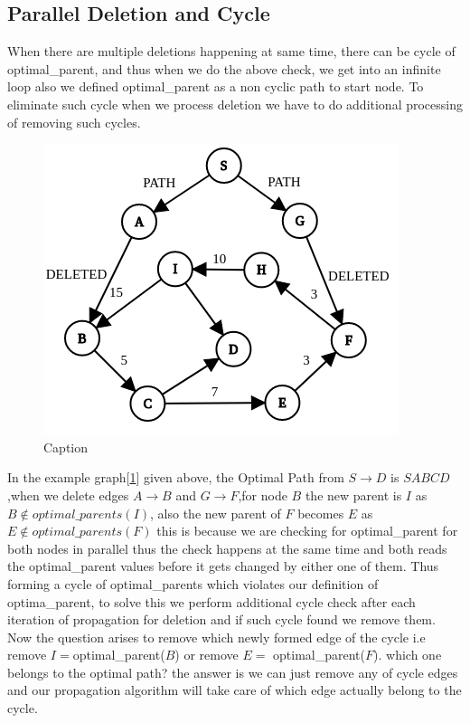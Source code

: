 \documentclass[a4paper]{article}
\begin{document}
\subsection{Parallel Deletion and Cycle}
When there are multiple deletions happening at same time, there can be cycle of optimal\_parent, and thus when we do the above check, we get into an infinite loop also we defined optimal\_parent as a non cyclic path to start node. To eliminate such cycle when we process deletion we have to do additional processing of removing such cycles.
\begin{figure}[H]
    \centering
    \includegraphics[scale=0.45]{img/Delete_cycle.png}
    \caption{Caption}
    \label{fig:delete_parallel_cycle}
\end{figure}

In the example graph[\ref{fig:delete_parallel_cycle}] given above, the Optimal Path from $S\rightarrow D$ is $SABCD$,when we delete edges $A \rightarrow B$ and $G \rightarrow F$,for node $B$ the new parent is $I$ as $B \notin optimal\_parents(I)$, also the new parent of $F$ becomes $E$ as $E \notin optimal\_parents(F)$ this is because we are checking for optimal\_parent for both nodes in parallel thus the check happens at the same time and both reads the optimal\_parent values before it gets changed by either one of them. Thus forming a cycle of optimal\_parents which violates our definition of optima\_parent, to solve this we perform additional cycle check after each iteration of propagation for deletion and if such cycle found we remove them.\\
Now the question arises to remove which newly formed edge of the cycle i.e remove $I= $optimal\_parent($B$) or remove $E=$ optimal\_parent($F$). which one belongs to the optimal path? the answer is we can just remove any of cycle edges and our propagation algorithm will take care of which edge actually belong to the cycle.\\
\end{document}
